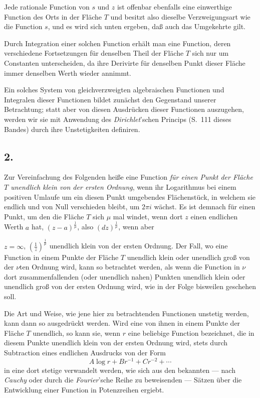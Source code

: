 \documentclass{article}
\begin{document}
Jede rationale Function von $s$ und $z$ ist offenbar ebenfalls eine einwerthige Function des Orts in der Fläche $T$ und besitzt also dieselbe Verzweigungsart wie die Function $s$, und es wird sich unten ergeben, daß auch das Umgekehrte gilt.

Durch Integration einer solchen Function erhält man eine Function, deren verschiedene Fortsetzungen für denselben Theil der Fläche $T$ sich nur um Constanten unterscheiden, da ihre Derivirte für denselben Punkt dieser Fläche immer denselben Werth wieder annimmt.

Ein solches System von gleichverzweigten algebraischen Functionen und Integralen dieser Functionen bildet zunächst den Gegenstand unserer Betrachtung; statt aber von diesen Ausdrücken dieser Functionen auszugehen, werden wir sie mit Anwendung des \emph{Dirichlet}'schen Princips (S.~111 dieses Bandes) durch ihre Unstetigkeiten definiren.

\subsection*{2.}

Zur Vereinfachung des Folgenden heiße eine Function \emph{für einen Punkt der Fläche $T$ unendlich klein von der ersten Ordnung}, wenn ihr Logarithmus bei einem positiven Umlaufe um ein diesen Punkt umgebendes Flächenstück, in welchem sie endlich und von Null verschieden bleibt, um $2\pi i$ wächst. Es ist demnach für einen Punkt, um den die Fläche $T$ sich $\mu$ mal windet, wenn dort $z$ einen endlichen Werth $a$ hat, $(z-a)^{\frac{1}{\mu}}$, also $(dz)^{\frac{1}{\mu}}$, wenn aber

$z = \infty$, $\left(\frac{1}{z}\right)^{\frac{1}{\mu}}$ unendlich klein von der ersten Ordnung. Der Fall, wo eine Function in einem Punkte der Fläche $T$ unendlich klein oder unendlich groß von der $\nu$ten Ordnung wird, kann so betrachtet werden, als wenn die Function in $\nu$ dort zusammenfallenden (oder unendlich nahen) Punkten unendlich klein oder unendlich groß von der ersten Ordnung wird, wie in der Folge bisweilen geschehen soll.

Die Art und Weise, wie jene hier zu betrachtenden Functionen unstetig werden, kann dann so ausgedrückt werden. Wird eine von ihnen in einem Punkte der Fläche $T$ unendlich, so kann sie, wenn $r$ eine beliebige Function bezeichnet, die in diesem Punkte unendlich klein von der ersten Ordnung wird, stets durch Subtraction eines endlichen Ausdrucks von der Form
\[ A \log r + B r^{-1} + C r^{-2} + \cdots \]
in eine dort stetige verwandelt werden, wie sich aus den bekannten --- nach \emph{Cauchy} oder durch die \emph{Fourier}'sche Reihe zu beweisenden --- Sätzen über die Entwicklung einer Function in Potenzreihen ergiebt.
\end{document}
